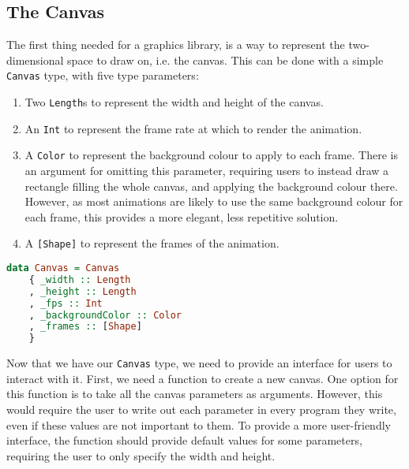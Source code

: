 \documentclass[../main.tex]{subfiles}
\begin{document}
        \subsection{The Canvas}
            The first thing needed for a graphics library, is a way to represent the
                two-dimensional space to draw on, i.e. the canvas.
            This can be done with a simple \verb|Canvas| type, with five type parameters:
            \begin{enumerate}
                \item Two \verb|Length|s to represent the width and height of the canvas.
                \item An \verb|Int| to represent the frame rate at which to render the animation.
                \item A \verb|Color| to represent the background colour to apply to each frame.
                      There is an argument for omitting this parameter, requiring users to instead
                          draw a rectangle filling the whole canvas, and applying the background colour
                          there.
                      However, as most animations are likely to use the same background colour for
                          each frame, this provides a more elegant, less repetitive solution.
                \item A \verb|[Shape]| to represent the frames of the animation.
            \end{enumerate}

            \begin{minipage}{\linewidth}
                \begin{lstlisting}[language=Haskell, label={lst:canvas}, caption={The Canvas type definition.
                    We use the field labels for internal use only. These are not exposed to the user, and 
                    are prefixed with \_ to indicate such, as well as to avoid polluting the namespace.}]
data Canvas = Canvas
    { _width :: Length
    , _height :: Length
    , _fps :: Int
    , _backgroundColor :: Color
    , _frames :: [Shape]
    }
                \end{lstlisting}
            \end{minipage}

            Now that we have our \verb|Canvas| type, we need to provide an interface for
                users to interact with it.
            First, we need a function to create a new canvas.
            One option for this function is to take all the canvas parameters as arguments.
            However, this would require the user to write out each parameter in every
                program they write, even if these values are not important to them.
            To provide a more user-friendly interface, the function should provide default
                values for some parameters, requiring the user to only specify the width and
                height.
\end{document}
